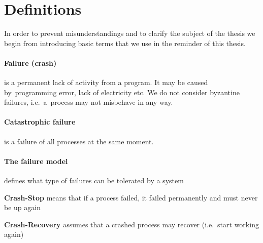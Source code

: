 



\clearpage

\section{Definitions}

In order to prevent misunderstandings and to clarify the subject of the thesis we begin from introducing
basic terms that we use in the reminder of this thesis.

\paragraph{Failure (crash)}
is a permanent lack of activity from a program. It may be caused by~programming error, lack of electricity etc.
We do not consider byzantine failures, i.e.~a~process may not misbehave in any way.

\paragraph{Catastrophic failure} is a failure of all processes at the same moment.

\paragraph{The failure model}
defines what type of failures can be tolerated by a system
\begin{tightList}[ \setlength{\leftmargin}{2\leftmargin}]
 \item[\textbf{Crash-Stop}] means that if a process failed, it failed permanently and must never be up again
 \item[\textbf{Crash-Recovery}] assumes that a crashed process may recover (i.e.\ start working again)
\end{tightList}

